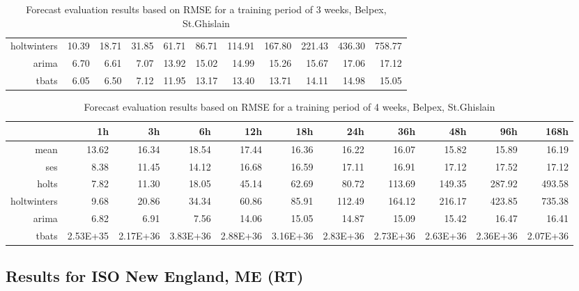 \begin{landscape}
\begin{table}[ht]
\begin{tabular}{rrrrrrrrrrr}
  holtwinters & 10.39 & 18.71 & 31.85 & 61.71 & 86.71 & 114.91 & 167.80 & 221.43 & 436.30 & 758.77 \\ 
  arima & 6.70 & 6.61 & 7.07 & 13.92 & 15.02 & 14.99 & 15.26 & 15.67 & 17.06 & 17.12 \\ 
  tbats & 6.05 & 6.50 & 7.12 & 11.95 & 13.17 & 13.40 & 13.71 & 14.11 & 14.98 & 15.05 \\ 
   \hline
\end{tabular}
\caption{Forecast evaluation results based on RMSE for a training period of 3 weeks, Belpex, St.Ghislain}
\label{tab:app_results_stghislain_3weeks}
\end{table}
\begin{table}[hb]
\centering
\begin{tabular}{rrrrrrrrrrr}
  \hline
 & 1h & 3h & 6h & 12h & 18h & 24h & 36h & 48h & 96h & 168h \\ 
  \hline
mean & 13.62 & 16.34 & 18.54 & 17.44 & 16.36 & 16.22 & 16.07 & 15.82 & 15.89 & 16.19 \\ 
  ses & 8.38 & 11.45 & 14.12 & 16.68 & 16.59 & 17.11 & 16.91 & 17.12 & 17.52 & 17.12 \\ 
  holts & 7.82 & 11.30 & 18.05 & 45.14 & 62.69 & 80.72 & 113.69 & 149.35 & 287.92 & 493.58 \\ 
  holtwinters & 9.68 & 20.86 & 34.34 & 60.86 & 85.91 & 112.49 & 164.12 & 216.17 & 423.85 & 735.38 \\ 
  arima & 6.82 & 6.91 & 7.56 & 14.06 & 15.05 & 14.87 & 15.09 & 15.42 & 16.47 & 16.41 \\ 
  tbats & 2.53E+35 & 2.17E+36 & 3.83E+36 & 2.88E+36 & 3.16E+36 & 2.83E+36 & 2.73E+36 & 2.63E+36 & 2.36E+36 & 2.07E+36 \\ 
   \hline
\end{tabular}
\caption{Forecast evaluation results based on RMSE for a training period of 4 weeks, Belpex, St.Ghislain}
\label{tab:app_results_stghislain_4weeks}
\vspace*{-0.4in}
\end{table}



\subsection{Results for ISO New England, ME (RT)}



\end{landscape}
